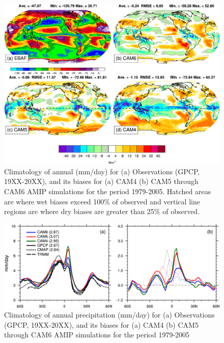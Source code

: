 \clearpage
\begin{figure}[t]
  \begin{center}
    \includegraphics[width=1.\textwidth,angle=0.]{./figs/f_SWCF_2D_CAM456_ANN.pdf}
  \end{center}
  \caption{Climatology of annual  (mm/day) for (a) Observations (GPCP, 19XX-20XX), and its biases for (a) CAM4 (b) CAM5  through CAM6 AMIP simulations for the period 1979-2005. Hatched areas are where wet biases exceed 100\% of observed and vertical line regions are where dry biases are greater than 25\% of observed.}
\label{f_PRECT_2D_CAM456}
\end{figure}
\clearpage
\begin{figure}[t]
    \includegraphics[width=1.\textwidth,angle=0.]{./figs/f_PRECT_1D_DJF_CAM456.pdf}
  \caption{Climatology of annual precipitation (mm/day) for (a) Observations (GPCP, 19XX-20XX), and its biases for (a) CAM4 (b) CAM5  through CAM6 AMIP simulations for the period 1979-2005} 
\label{f_PRECT_1D_DJF_CAM456}
\end{figure} 
